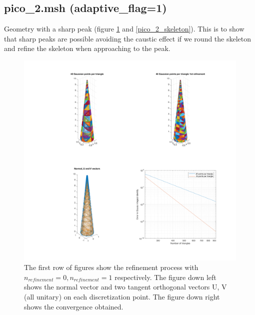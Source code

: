\documentclass[11pt, oneside]{article}   	%
\begin{document}
\newpage
\subsection{pico\_2.msh (adaptive\_flag=1)}
Geometry with a sharp peak (figure \ref{pico_2} and \ref{pico_2_skeleton}). This is to show that sharp peaks are possible avoiding the caustic effect if we round the skeleton and refine the skeleton when approaching to the peak.



\begin{figure}[H]
\begin{center}
\includegraphics[width=5.6in]{pico_2.pdf}
\end{center}
\caption{The first row of figures show the refinement process with $n_{refinement}=0, n_{refinement}=1$ respectively.
The figure down left shows the normal vector and two tangent orthogonal vectors U, V (all unitary) on each discretization point. The figure down right shows the convergence obtained.}
\label{pico_2}
\end{figure}
\end{document}
